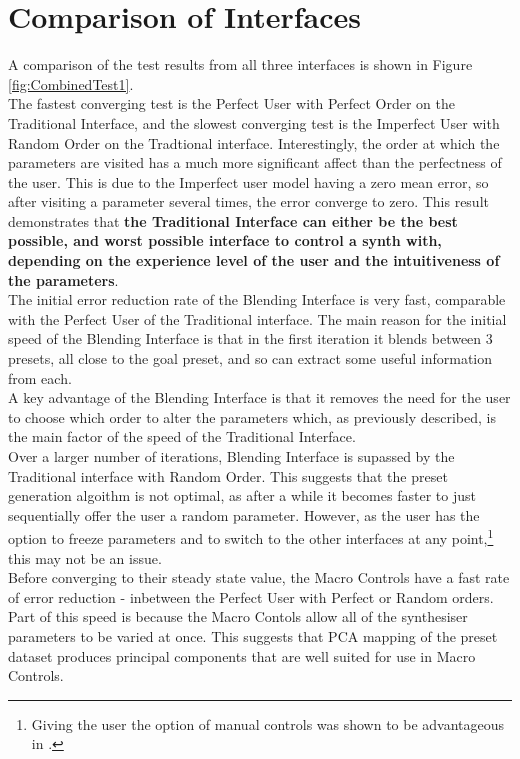 \documentclass[11pt, oneside]{report}   	%
\begin{document}
\section{Comparison of Interfaces}
A comparison of the test results from all three interfaces is shown in Figure \ref{fig:CombinedTest1}.  
\\
The fastest converging test is the Perfect User with Perfect Order on the Traditional Interface, and the slowest converging test is the Imperfect User with Random Order on the Tradtional interface. Interestingly, the order at which the parameters are visited has a much more significant affect than the perfectness of the user. This is due to the Imperfect user model having a zero mean error, so after visiting a parameter several times, the error converge to zero. This result demonstrates that \textbf{the Traditional Interface can either be the best possible, and worst possible interface to control a synth with, depending on the experience level of the user and the intuitiveness of the parameters}.
\\
The initial error reduction rate of the Blending Interface is very fast, comparable with the Perfect User of the Traditional interface. The main reason for the initial speed of the Blending Interface is that in the first iteration it blends between 3 presets, all close to the goal preset, and so can extract some useful information from each.\\
A key advantage of the Blending Interface is that it removes the need for the user to choose which order to alter the parameters which, as previously described, is the main factor of the speed of the Traditional Interface.\\
 Over a larger number of iterations, Blending Interface is supassed by the Traditional interface with Random Order. This suggests that the preset generation algoithm is not optimal, as after a while it becomes faster to just sequentially offer the user a random parameter. However, as the user has the option to freeze parameters and to switch to the other interfaces at any point,\footnote{Giving the user the option of manual controls was shown to be advantageous in \cite{PreferenceGallery}.} this may not be an issue. \\
Before converging to their steady state value, the Macro Controls have a fast rate of error reduction - inbetween the Perfect User with Perfect or Random orders. Part of this speed is because the Macro Contols allow all of the synthesiser parameters to be varied at once. This suggests that PCA mapping of the preset dataset produces principal components that are well suited for use in Macro Controls.\\
\end{document}
